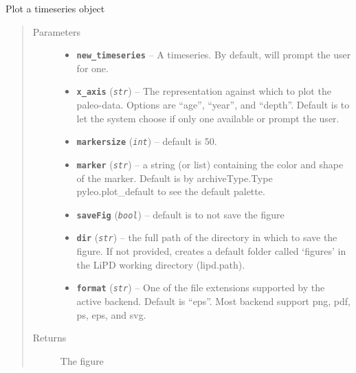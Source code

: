 \documentclass[letterpaper,10pt,english]{sphinxmanual}
\begin{document}
\begin{fulllineitems}
\begin{fulllineitems}
\end{fulllineitems}


\begin{fulllineitems}
\label{TSPlots:pyleoclim.Plot.plotoneTSO}
Plot a timeseries object
\begin{quote}\begin{description}
\item[{Parameters}] \leavevmode\begin{itemize}
\item {} 
\textbf{\texttt{new\_timeseries}} -- A timeseries. By default, will prompt the user for one.

\item {} 
\textbf{\texttt{x\_axis}} (\emph{\texttt{str}}) -- The representation against which to plot the
paleo-data. Options are ``age'', ``year'', and ``depth''.
Default is to let the system choose if only one available or
prompt the user.

\item {} 
\textbf{\texttt{markersize}} (\emph{\texttt{int}}) -- default is 50.

\item {} 
\textbf{\texttt{marker}} (\emph{\texttt{str}}) -- a string (or list) containing the color and shape of
the marker. Default is by archiveType.Type pyleo.plot\_default
to see the default palette.

\item {} 
\textbf{\texttt{saveFig}} (\emph{\texttt{bool}}) -- default is to not save the figure

\item {} 
\textbf{\texttt{dir}} (\emph{\texttt{str}}) -- the full path of the directory in which to save the
figure. If not provided, creates a default folder called
`figures' in the LiPD working directory (lipd.path).

\item {} 
\textbf{\texttt{format}} (\emph{\texttt{str}}) -- One of the file extensions supported by the active
backend. Default is ``eps''. Most backend support png, pdf, ps, eps,
and svg.

\end{itemize}

\item[{Returns}] \leavevmode
The figure

\end{description}\end{quote}

\end{fulllineitems}


\end{fulllineitems}
\end{document}
